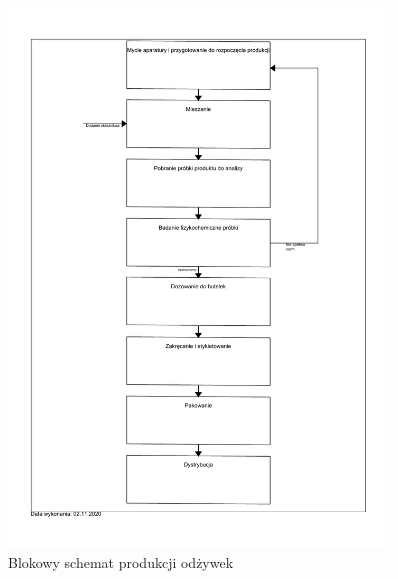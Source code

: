 \begin{figure}[H]
	\centering
	\includegraphics[width=0.9\textwidth]{./sec5/odżywki.pdf}
	\vspace{-3em}
	\caption{Blokowy schemat produkcji odżywek}
\end{figure}
